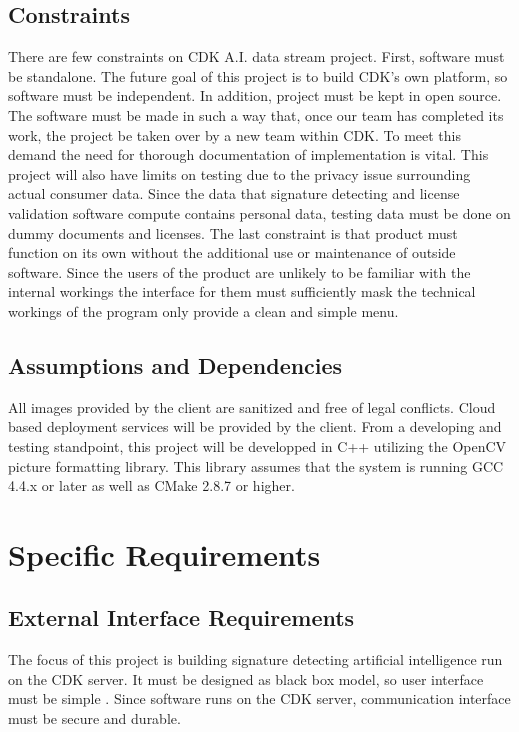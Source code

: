 \documentclass[onecolumn, draftclsnofoot,10pt, compsoc]{IEEEtran}
\begin{document}
\subsection{Constraints}
There are few constraints on CDK A.I. data stream project. First, software must be standalone. The future goal of this project is to build CDK’s own platform, so software must be independent. In addition, project must be kept in open source. The software must be made in such a way that, once our team has completed its work, the project be taken over by a new team within CDK. To meet this demand the need for thorough documentation of implementation is vital. This project will also have limits on testing due to the privacy issue surrounding actual consumer data. Since the data that signature detecting and license validation software compute contains personal data, testing data must be done on dummy documents and licenses. The last constraint is that product must function on its own without the additional use or maintenance of outside software. Since the users of the product are unlikely to be familiar with the internal workings the interface for them must sufficiently mask the technical workings of the program only provide a clean and simple menu.

\subsection{Assumptions and Dependencies}

All images provided by the client are sanitized and free of legal conflicts. Cloud based deployment services will be provided by the client. From a developing and testing standpoint, this project will be developped in C++ utilizing the OpenCV picture formatting library. This library assumes that the system is running GCC 4.4.x or later as well as CMake 2.8.7 or higher. 



\section{Specific Requirements}

\subsection{External Interface Requirements}
The focus of this project is building signature detecting artificial intelligence run on the CDK server. It must be designed as black box model, so user interface must be simple . Since software runs on the CDK server, communication interface must be secure and durable. 
\end{document}
